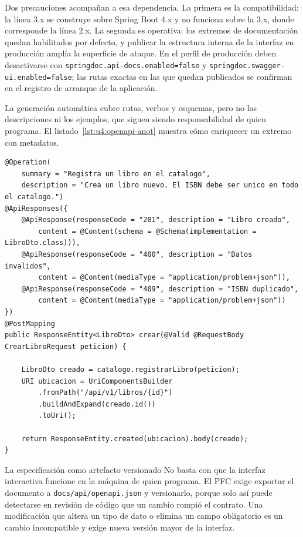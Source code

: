\documentclass[11pt,a4paper,openany]{book}
\begin{document}
Dos precauciones acompañan a esa dependencia. La primera es la compatibilidad: la línea 3.x se construye sobre Spring Boot 4.x y no funciona sobre la 3.x, donde corresponde la línea 2.x. La segunda es operativa: los extremos de documentación quedan habilitados por defecto, y publicar la estructura interna de la interfaz en producción amplía la superficie de ataque. En el perfil de producción deben desactivarse con \texttt{springdoc.api-docs.enabled=false} y \texttt{springdoc.swagger-ui.enabled=false}; las rutas exactas en las que quedan publicados se confirman en el registro de arranque de la aplicación.

La generación automática cubre rutas, verbos y esquemas, pero no las descripciones ni los ejemplos, que siguen siendo responsabilidad de quien programa. El listado~\ref{lst:u4:openapi-anot} muestra cómo enriquecer un extremo con metadatos.

\begin{lstlisting}[style=java,caption={Anotaciones que enriquecen la especificacion generada.},label={lst:u4:openapi-anot}]
@Operation(
	summary = "Registra un libro en el catalogo",
	description = "Crea un libro nuevo. El ISBN debe ser unico en todo el catalogo.")
@ApiResponses({
	@ApiResponse(responseCode = "201", description = "Libro creado",
		content = @Content(schema = @Schema(implementation = LibroDto.class))),
	@ApiResponse(responseCode = "400", description = "Datos invalidos",
		content = @Content(mediaType = "application/problem+json")),
	@ApiResponse(responseCode = "409", description = "ISBN duplicado",
		content = @Content(mediaType = "application/problem+json"))
})
@PostMapping
public ResponseEntity<LibroDto> crear(@Valid @RequestBody CrearLibroRequest peticion) {

	LibroDto creado = catalogo.registrarLibro(peticion);
	URI ubicacion = UriComponentsBuilder
		.fromPath("/api/v1/libros/{id}")
		.buildAndExpand(creado.id())
		.toUri();

	return ResponseEntity.created(ubicacion).body(creado);
}
\end{lstlisting}

\begin{cajaadvertencia}{La especificación como artefacto versionado}
	No basta con que la interfaz interactiva funcione en la máquina de quien programa. El PFC exige exportar el documento a \texttt{docs/api/openapi.json} y versionarlo, porque solo así puede detectarse en revisión de código que un cambio rompió el contrato. Una modificación que altera un tipo de dato o elimina un campo obligatorio es un cambio incompatible y exige nueva versión mayor de la interfaz.
\end{cajaadvertencia}
\end{document}
